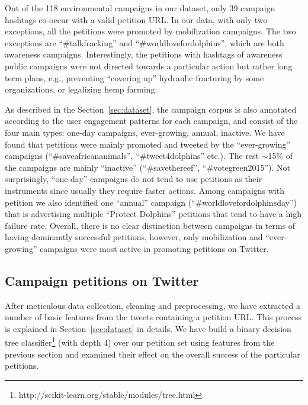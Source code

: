 Out of the 118 environmental campaigns in our dataset, only 39 campaign hashtags co-occur with a valid petition URL.
In our data, with only two exceptions, all the petitions were promoted by mobilization campaigns. The two exceptions are ``\#talkfracking'' and ``\#worldlovefordolphins'', which are both awareness campaigns.
Interestingly, the petitions with hashtags of awareness public campaigns were not directed towards a particular action but rather long term plans, e.g., preventing ``covering up'' hydraulic fracturing by some organizations, or legalizing hemp farming.

As described in the Section~\ref{sec:dataset}, the campaign corpus is also annotated according to the user engagement patterns for each campaign, and consist of the four main types: one-day campaigns, ever-growing, annual, inactive.
We have found that petitions were mainly promoted and tweeted by the ``ever-growing'' campaigns (``\#saveafricananimals'', ``\#tweet4dolphins'' etc.).
The rest $\sim$15\% of the campaigns are mainly ``inactive'' (``\#savethereef'', ``\#votegreen2015'').
Not surprisingly, ``one-day'' campaigns do not tend to use petitions as their instruments since usually they require faster actions.
Among campaigns with petition we also identified one ``annual'' campaign (``\#worldlovefordolphinsday'') that is advertising multiple ``Protect Dolphins'' petitions that tend to have a high failure rate.
Overall, there is no clear distinction between campaigns in terms of having dominantly successful petitions, however, only mobilization and ``ever-growing'' campaigns were most active in promoting petitions on Twitter.

\subsection{Campaign petitions on Twitter}
After meticulous data collection, cleaning and preprocessing, we have extracted a number of basic features from the tweets containing a petition URL.
This process is explained in Section~\ref{sec:dataset} in details.
We have build a binary decision tree classifier\footnote{ http://scikit-learn.org/stable/modules/tree.html } (with depth 4) over our petition set using features from the previous section and examined their effect on the overall success of the particular petitions.

